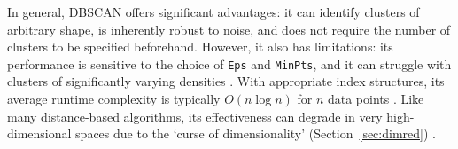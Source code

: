 \documentclass[10pt,oneside]{report}
\begin{document}


In general, DBSCAN offers significant advantages: it can identify clusters of arbitrary shape, is inherently robust to noise, and does not require the number of clusters to be specified beforehand. However, it also has limitations: its performance is sensitive to the choice of \texttt{Eps} and \texttt{MinPts}, and it can struggle with clusters of significantly varying densities \cite{ester1996density, campello2013density}. With appropriate index structures, its average runtime complexity is typically $O(n\log n)$ for $n$ data points \cite{ester1996density}. Like many distance-based algorithms, its effectiveness can degrade in very high-dimensional spaces due to the `curse of dimensionality' (Section~\ref{sec:dimred}) \cite{hinneburg1999optimal, verleysen2005curse}.

\end{document}
